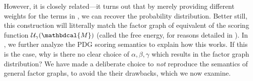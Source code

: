 \documentclass[letterpaper]{article} %
\theoremstyle{plain}
\newtheorem{coro}{Corollary}[theorem]
\theoremstyle{definition}
\theoremstyle{remark}
\newcommand{\todo}[1]{{\color{red}\ \!\Large\smash{\textbf{[}}{\normalsize\textsc{todo:} #1}\ \!\smash{\textbf{]}}}}
\newcommand{\dg}[1]{\mathbdcal{#1}}
\newcommand{\PDGof}[1]{{\dg M}_{#1}}
\begin{document}
{However, it is closely related---it turns out that by merely providing different weights for the terms in , we can recover the probability distribution. Better still, this construction will litterally match the factor graph of equivalent of the scoring function $\mathcal U_\gamma(\dg M)$ (called the free energy, for reasons detailed in ).
%
	In , we further analyze the PDG scoring semantics to explain how this works.
	If this is the case, why is there no clear choice of $\alpha,\beta,\gamma$ which results in the factor graph distribution?  
	We have made a deliberate choice to \emph{not} reproduce the semantics of general factor graphs, to avoid the their drawbacks, which 
	we now examine.





%		
%		

}
\end{document}
